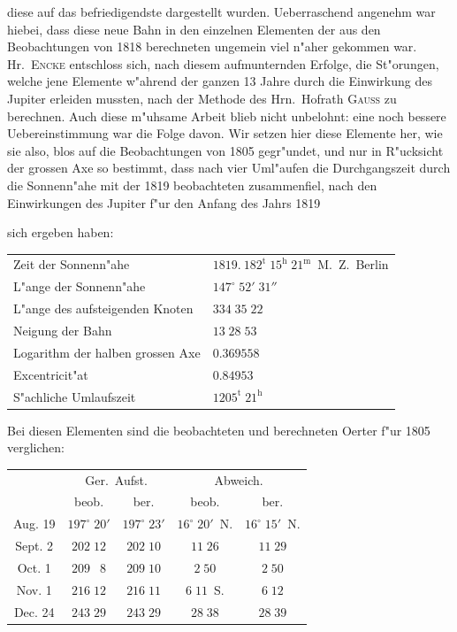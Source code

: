 \documentclass[12pt,a4paper]{article}
\begin{document}
diese auf das befriedigendste dargestellt wurden. Ueberraschend angenehm war hiebei, dass diese neue
Bahn in den einzelnen Elementen der aus den Beobachtungen von 1818 berechneten ungemein viel
n"aher gekommen war. Hr.~\textsc{Encke} entschloss sich, nach diesem aufmunternden Erfolge, die St"orungen,
welche jene Elemente w"ahrend der ganzen 13 Jahre durch die Einwirkung des Jupiter erleiden mussten,
nach der Methode des Hrn.~Hofrath \textsc{Gauss} zu berechnen. Auch diese m"uhsame Arbeit blieb nicht
unbelohnt: eine noch bessere Uebereinstimmung war die Folge davon. Wir setzen hier diese Elemente
her, wie sie also, blos auf die Beobachtungen von 1805 gegr"undet, und nur in R"ucksicht der grossen
Axe so bestimmt, dass nach vier Uml"aufen die Durchgangszeit durch die Sonnenn"ahe mit der 1819
beobachteten zusammenfiel, nach den Einwirkungen des Jupiter f"ur den Anfang des Jahrs 1819

\newpage

sich ergeben haben:

\begin{center}
\begin{tabular}{l@{\dotfill}l}
Zeit der Sonnenn"ahe & $1819.\ 182^{\mathrm{t}}\;15^{\mathrm{h}}\;21^{\mathrm{m}}$~M.~Z.~Berlin \\
L"ange der Sonnenn"ahe & $147^{\circ}\;52'\;31''$ \\
L"ange des aufsteigenden Knoten & $334\;35\;22$ \\
Neigung der Bahn & $13\;28\;53$ \\
Logarithm der halben grossen Axe & $0.369558$ \\
Excentricit"at & $0.84953$ \\
S"achliche Umlaufszeit & $1205^{\mathrm{t}}\;21^{\mathrm{h}}$ \\
\end{tabular}
\end{center}

Bei diesen Elementen sind die beobachteten und berechneten Oerter f"ur 1805 verglichen:

\begin{center}
\small
\begin{tabular}{c|c|c|c|c}
\toprule
& \multicolumn{2}{c|}{Ger.~Aufst.} & \multicolumn{2}{c}{Abweich.} \\
& beob. & ber. & beob. & ber. \\
\midrule
Aug. 19 & $197^{\circ}\;20'$ & $197^{\circ}\;23'$ & $16^{\circ}\;20'$~N. & $16^{\circ}\;15'$~N. \\
Sept. 2 & $202\;12$ & $202\;10$ & $11\;26$ & $11\;29$ \\
Oct. 1 & $209\;\phantom{0}8$ & $209\;10$ & $2\;50$ & $2\;50$ \\
Nov. 1 & $216\;12$ & $216\;11$ & $6\;11$~S. & $6\;12$ \\
Dec. 24 & $243\;29$ & $243\;29$ & $28\;38$ & $28\;39$ \\
\bottomrule
\end{tabular}
\end{center}
\end{document}
